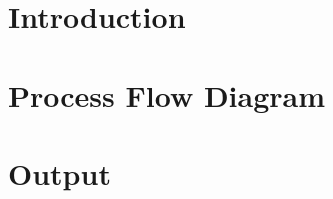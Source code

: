\documentclass[12pt]{article}
\begin{document}


\section{Introduction}

\section{Process Flow Diagram}

\section{Output}



\end{document}
